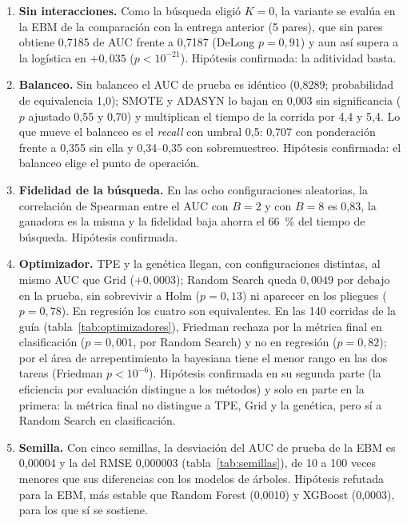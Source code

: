 \begin{enumerate}
  \item \textbf{Sin interacciones.} Como la búsqueda eligió $K = 0$, la variante se evalúa en la EBM de la
        comparación con la entrega anterior (5 pares), que sin pares obtiene 0,7185 de AUC frente a 0,7187
        (DeLong $p = 0{,}91$) y aun así supera a la logística en $+0{,}035$ ($p < 10^{-21}$). Hipótesis
        confirmada: la aditividad basta.
  \item \textbf{Balanceo.} Sin balanceo el AUC de prueba es idéntico (0,8289; probabilidad de equivalencia
        1,0); SMOTE y ADASYN lo bajan en 0,003
        sin significancia ($p$ ajustado 0,55 y 0,70) y multiplican el tiempo de la corrida por 4,4
        y 5,4. Lo que mueve el balanceo es el \emph{recall} con umbral
        0,5: 0,707 con ponderación frente a 0,355 sin ella y 0,34--0,35 con sobremuestreo. Hipótesis
        confirmada: el balanceo elige el punto de operación.
  \item \textbf{Fidelidad de la búsqueda.} En las ocho configuraciones aleatorias, la correlación de Spearman
        entre el AUC con $B = 2$ y con $B = 8$ es 0,83, la ganadora es la misma y la fidelidad
        baja ahorra el 66~\% del tiempo de búsqueda. Hipótesis confirmada.
  \item \textbf{Optimizador.} TPE y la genética llegan, con configuraciones distintas, al mismo AUC que Grid
        ($+0{,}0003$); Random Search queda $0{,}0049$ por debajo en la prueba, sin sobrevivir a Holm
        ($p = 0{,}13$) ni aparecer en los pliegues ($p = 0{,}78$). En regresión los cuatro son equivalentes. En
        las 140 corridas de la guía (tabla~\ref{tab:optimizadores}), Friedman rechaza por la métrica final en
        clasificación ($p = 0{,}001$, por Random Search) y no en regresión ($p = 0{,}82$); por el área de
        arrepentimiento la bayesiana tiene el menor rango en las dos tareas (Friedman $p < 10^{-6}$). Hipótesis
        confirmada en su segunda parte (la eficiencia por evaluación distingue a los métodos) y solo en parte en
        la primera: la métrica final no distingue a TPE, Grid y la genética, pero sí a Random Search en
        clasificación.
  \item \textbf{Semilla.} Con cinco semillas, la desviación del AUC de prueba de la EBM es 0,00004 y la del
        RMSE 0,000003 (tabla~\ref{tab:semillas}), de 10 a 100 veces menores que sus diferencias con los modelos
        de árboles. Hipótesis refutada para la EBM, más estable que Random Forest (0,0010) y XGBoost (0,0003),
        para los que sí se sostiene.
\end{enumerate}

